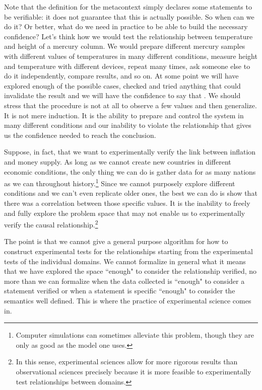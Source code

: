 Note that the definition for the metacontext simply declares some statements to be verifiable: it does not guarantee that this is actually possible. So when can we do it? Or better, what do we need in practice to be able to build the necessary confidence? Let's think how we would test the relationship between temperature and height of a mercury column. We would prepare different mercury samples with different values of temperatures in many different conditions, measure height and temperature with different devices, repeat many times, ask someone else to do it independently, compare results, and so on. At some point we will have explored enough of the possible cases, checked and tried anything that could invalidate the result and we will have the confidence to say that . We should stress that the procedure is not at all to observe a few values and then generalize. It is not mere induction. It is the ability to prepare and control the system in many different conditions and our inability to violate the relationship that gives us the confidence needed to reach the conclusion.

Suppose, in fact, that we want to experimentally verify the link between inflation and money supply. As long as we cannot create new countries in different economic conditions, the only thing we can do is gather data for as many nations as we can throughout history.\footnote{Computer simulations can sometimes alleviate this problem, though they are only as good as the model one uses.} Since we cannot purposely explore different conditions and we can't even replicate older ones, the best we can do is show that there was a correlation between those specific values. It is the inability to freely and fully explore the problem space that may not enable us to experimentally verify the causal relationship.\footnote{In this sense, experimental sciences allow for more rigorous results than observational sciences precisely because it is more feasible to experimentally test relationships between domains.}

The point is that we cannot give a general purpose algorithm for how to construct experimental tests for the relationships starting from the experimental tests of the individual domains. We cannot formalize in general what it means that we have explored the space ``enough" to consider the relationship verified, no more than we can formalize when the data collected is ``enough" to consider a statement verified or when a statement is specific ``enough" to consider the semantics well defined. This is where the practice of experimental science comes in.


